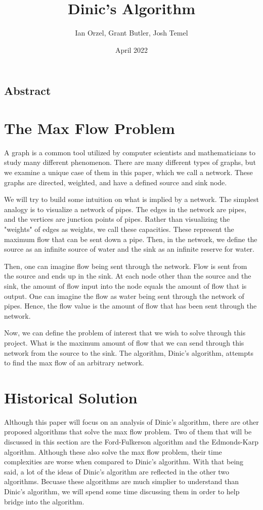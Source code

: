 \documentclass{report}
\title{Dinic's Algorithm}
\author{Ian Orzel, Grant Butler, Josh Temel}
\date{April 2022}
\begin{document}
\maketitle

\tableofcontents

\section{Abstract}

\chapter{The Max Flow Problem}
A graph is a common tool utilized by computer scientists and mathematicians to study many different phenomenon. There are many different types of graphs, but we examine a unique case of them in this paper, which we call a network. These graphs are directed, weighted, and have a defined source and sink node.

We will try to build some intuition on what is implied by a network. The simplest analogy is to visualize a network of pipes. The edges in the network are pipes, and the vertices are junction points of pipes. Rather than visualizing the "weights" of edges as weights, we call these capacities. These represent the maximum flow that can be sent down a pipe. Then, in the network, we define the source as an infinite source of water and the sink as an infinite reserve for water.

Then, one can imagine flow being sent through the network. Flow is sent from the source and ends up in the sink. At each node other than the source and the sink, the amount of flow input into the node equals the amount of flow that is output. One can imagine the flow as water being sent through the network of pipes. Hence, the flow value is the amount of flow that has been sent through the network.

Now, we can define the problem of interest that we wish to solve through this project. What is the maximum amount of flow that we can send through this network from the source to the sink. The algorithm, Dinic's algorithm, attempts to find the max flow of an arbitrary network.

\chapter{Historical Solution}
Although this paper will focus on an analysis of Dinic's algorithm, there are other proposed algorithms that solve the max flow problem. Two of them that will be discussed in this section are the Ford-Fulkerson algorithm and the Edmonds-Karp algorithm. Although these also solve the max flow problem, their time complexities are worse when compared to Dinic's algorithm. With that being said, a lot of the ideas of Dinic's algorithm are reflected in the other two algorithms. Becuase these algorithms are much simplier to understand than Dinic's algorithm, we will spend some time discussing them in order to help bridge into the algorithm.
\end{document}
